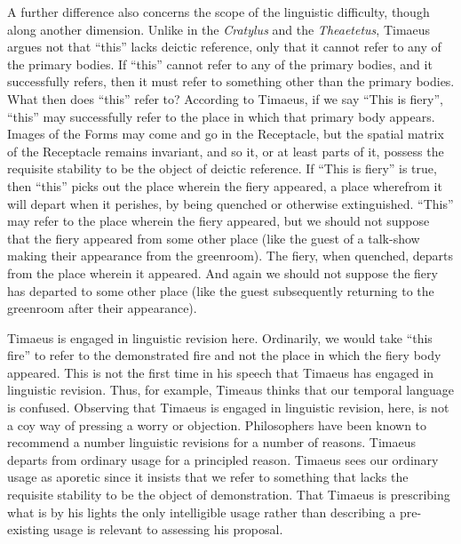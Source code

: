 A further difference also concerns the scope of the linguistic difficulty, though along another dimension. Unlike in the \emph{Cratylus} and the \emph{Theaetetus}, Timaeus argues not that ``this'' lacks deictic reference, only that it cannot refer to any of the primary bodies. If ``this'' cannot refer to any of the primary bodies, and it successfully refers, then it must refer to something other than the primary bodies. What then does ``this'' refer to? According to Timaeus, if we say ``This is fiery'', ``this'' may successfully refer to the place in which that primary body appears. Images of the Forms may come and go in the Receptacle, but the spatial matrix of the Receptacle remains invariant, and so it, or at least parts of it, possess the requisite stability to be the object of deictic reference. If ``This is fiery'' is true, then ``this'' picks out the place wherein the fiery appeared, a place wherefrom it will depart when it perishes, by being quenched or otherwise extinguished. ``This'' may refer to the place wherein the fiery appeared, but we should not suppose that the fiery appeared from some other place (like the guest of a talk-show making their appearance from the greenroom). The fiery, when quenched, departs from the place wherein it appeared. And again we should not suppose the fiery has departed to some other place (like the guest subsequently returning to the greenroom after their appearance).

Timaeus is engaged in linguistic revision here. Ordinarily, we would take ``this fire'' to refer to the demonstrated fire and not the place in which the fiery body appeared. This is not the first time in his speech that Timaeus has engaged in linguistic revision. Thus, for example, Timeaus thinks that our temporal language is confused. Observing that Timaeus is engaged in linguistic revision, here, is not a coy way of pressing a worry or objection. Philosophers have been known to recommend a number linguistic revisions for a number of reasons. Timaeus departs from ordinary usage for a principled reason. Timaeus sees our ordinary usage as aporetic since it insists that we refer to something that lacks the requisite stability to be the object of demonstration. That Timaeus is prescribing what is by his lights the only intelligible usage rather than describing a pre-existing usage is relevant to assessing his proposal. 

